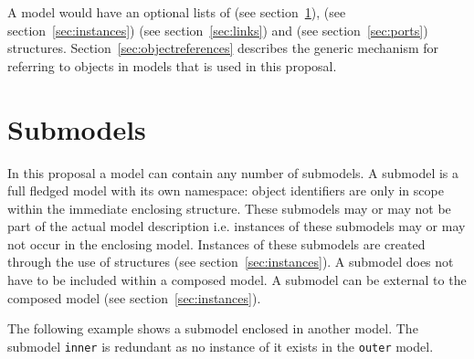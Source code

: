 \documentclass{cekarticle}
\begin{document}
A model would have an optional lists of
 (see section~\ref{sec:submodels}),
 (see section~\ref{sec:instances})
 (see section~\ref{sec:links})
and  (see section~\ref{sec:ports}) structures.
Section~\ref{sec:objectreferences} describes the
generic mechanism for referring to objects in models that is used in this
proposal.

\section{Submodels}
\label{sec:submodels}

In this proposal a model can contain any number of submodels.  A submodel is a full
fledged model with its own namespace: object identifiers are only in scope within the
immediate enclosing  structure. These submodels may or may not be part
of the actual model description i.e. instances of these submodels may or may not
occur in the enclosing model.  Instances of these submodels are created through the
use of  structures (see section~\ref{sec:instances}). A submodel does
not have to be included within a composed model.  A submodel can be external to the
composed model (see section~\ref{sec:instances}). 

The following example shows a submodel enclosed in another model.  The submodel \texttt{inner} is redundant as no instance
of it exists in the \texttt{outer} model.
\end{document}
